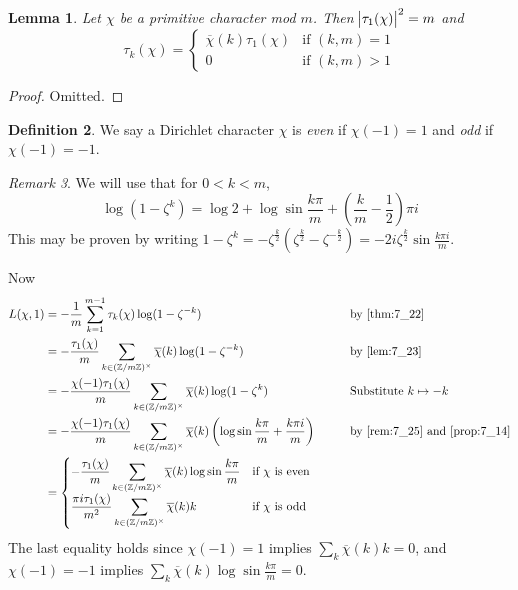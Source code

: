 \documentclass[11pt]{article}
\theoremstyle{definition}
\newtheorem{definition}{Definition}[section]
\theoremstyle{plain}
\newtheorem{lemma}[definition]{Lemma}
\theoremstyle{remark}
\newtheorem{remark}[definition]{Remark}
\newcommand{\ZZ}{\mathbb{Z}}
\begin{document}
\begin{lemma}\label{lem:7_23}
    Let $\chi$ be a primitive character mod $m$. Then $\abs{\tau_1(\chi)}^2 = m$ and
    \begin{equation*}
        \tau_k(\chi) = \begin{cases}
            \overline{\chi}(k) \tau_1(\chi) & \text{if } (k,m)=1\\
            0 & \text{if } (k,m) > 1
        \end{cases}
    \end{equation*}
\end{lemma}
\begin{proof}
    Omitted.
\end{proof}

\begin{definition}\label{def:7_24}
    We say a Dirichlet character $\chi$ is \emph{even} if $\chi(-1) = 1$ and \emph{odd} if $\chi(-1) = -1$.
\end{definition}

\begin{remark}\label{rem:7_25}
    We will use that for $0 < k < m$,
    \begin{equation*}
        \log(1-\zeta^k) = \log 2 + \log \sin \frac{k \pi}{m} + \left(\frac{k}{m} - \frac{1}{2}\right) \pi i
    \end{equation*}
    This may be proven by writing $1 - \zeta^k = -\zeta^{\frac{k}{2}} (\zeta^{\frac{k}{2}} - \zeta^{-\frac{k}{2}}) = -2i \zeta^{\frac{k}{2}} \sin \frac{k \pi i}{m}$.
\end{remark}
\noindent Now
\begin{alignat*}{3}
    L(\chi, 1)
    &= -\frac{1}{m} \sum_{k=1}^{m-1} \tau_k(\chi) \log(1 - \zeta^{-k}) &&\qquad \text{by \ref{thm:7_22}}\\
    &= -\frac{\tau_1(\chi)}{m} \sum_{k \in (\ZZ / m\ZZ)^\times} \overline{\chi}(k) \log(1 - \zeta^{-k}) &&\qquad \text{by \ref{lem:7_23}}\\
    &= -\frac{\chi(-1) \tau_1(\chi)}{m} \sum_{k \in (\ZZ / m\ZZ)^\times} \overline{\chi}(k) \log(1 - \zeta^k) &&\qquad \text{Substitute } k \mapsto -k\\
    &= -\frac{\chi(-1) \tau_1(\chi)}{m} \sum_{k \in (\ZZ / m\ZZ)^\times} \overline{\chi}(k) \left(\log \sin \frac{k \pi}{m} + \frac{k \pi i}{m}\right) &&\qquad \text{by \ref{rem:7_25} and \ref{prop:7_14}}\\
    &= \begin{cases}
        \displaystyle-\frac{\tau_1(\chi)}{m} \sum_{k \in (\ZZ / m\ZZ)^\times} \overline{\chi}(k) \log \sin \frac{k \pi}{m} & \text{if } \chi \text{ is even}\\
        \displaystyle\frac{\pi i \tau_1(\chi)}{m^2} \sum_{k \in (\ZZ / m\ZZ)^\times} \overline{\chi}(k) k & \text{if } \chi \text{ is odd}
    \end{cases}
\end{alignat*}
The last equality holds since $\chi(-1) = 1$ implies $\sum_k \overline{\chi}(k) k = 0$, and $\chi(-1) = -1$ implies $\sum_k \overline{\chi}(k) \log \sin \frac{k \pi}{m} = 0$.
\end{document}
